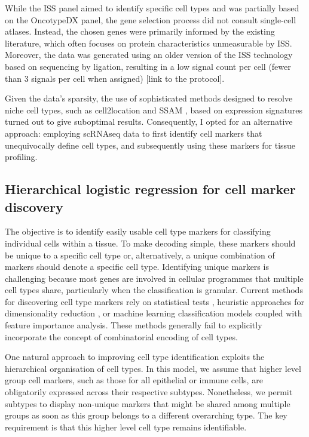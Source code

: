 While the \ac{ISS} panel aimed to identify specific cell types and was partially based on the OncotypeDX panel, the gene selection process did not consult single-cell atlases. Instead, the chosen genes were primarily informed by the existing literature, which often focuses on protein characteristics unmeasurable by \ac{ISS}. Moreover, the data was generated using an older version of the \ac{ISS} technology based on sequencing by ligation, resulting in a low signal count per cell (fewer than 3 signals per cell when assigned) [link to the protocol].

Given the data's sparsity, the use of sophisticated methods designed to resolve niche cell types, such as cell2location \parencite{Kleshchevnikov2022-ub} and SSAM \parencite{Park2021-hi}, based on expression signatures turned out to give suboptimal results. Consequently, I opted for an alternative approach: employing \ac{scRNAseq} data to first identify cell markers that unequivocally define cell types, and subsequently using these markers for tissue profiling.

\subsection{Hierarchical logistic regression for cell marker discovery}
\label{sec:modalities-schierarchy}


The objective is to identify easily usable cell type markers for classifying individual cells within a tissue. To make decoding simple, these markers should be unique to a specific cell type or, alternatively, a unique combination of markers should denote a specific cell type. Identifying unique markers is challenging because most genes are involved in cellular programmes that multiple cell types share, particularly when the classification is granular. Current methods for discovering cell type markers rely on statistical tests \parencite{Wolf2018-kx}, heuristic approaches for dimensionality reduction \parencite{Dumitrascu2021-dg, Dai2022-ve, Missarova2021-vg}, or machine learning classification models \parencite{Nelson2022-vg} coupled with feature importance analysis. These methods generally fail to explicitly incorporate the concept of combinatorial encoding of cell types.

One natural approach to improving cell type identification exploits the hierarchical organisation of cell types. In this model, we assume that higher level group cell markers, such as those for all epithelial or immune cells, are obligatorily expressed across their respective subtypes. Nonetheless, we permit subtypes to display non-unique markers that might be shared among multiple groups as soon as this group belongs to a different overarching type. The key requirement is that this higher level cell type remains identifiable.

